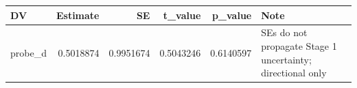 
\begin{tabular}[t]{lrrrrl}
\toprule
DV & Estimate & SE & t\_value & p\_value & Note\\
\midrule
probe\_d & 0.5018874 & 0.9951674 & 0.5043246 & 0.6140597 & SEs do not propagate Stage 1 uncertainty; directional only\\
\bottomrule
\end{tabular}
